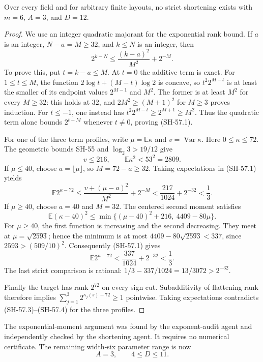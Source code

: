 \begin{theorem}
\label{thm:width-six-three-term-dimension-twelve}
Over every field and for arbitrary finite layouts, no
strict shortening exists with $m=6$, $A=3$, and $D=12$.
\end{theorem}
\begin{proof}
We use an integer quadratic majorant for the exponential
rank bound.  If $a$ is an integer, $N-a=M\geq32$, and
$k\leq N$ is an integer, then
\[
       2^{k-N}\leq\frac{(k-a)^2}{M^2}+2^{-M}.
 \tag{SH-57.1}
\]
To prove this, put $t=k-a\leq M$.  At $t=0$ the
additive term is exact.  For $1\leq t\leq M$,
the function $2\log t+(M-t)\log2$ is concave, so
$t^2 2^{M-t}$ is at least the smaller of its endpoint
values $2^{M-1}$ and $M^2$.  The former is at least
$M^2$ for every $M\geq32$: this holds at $32$, and
$2M^2\geq(M+1)^2$ for $M\geq3$ proves induction.
For $t\leq-1$, one instead has
$t^2 2^{M-t}\geq2^{M+1}\geq M^2$.
Thus the quadratic term alone bounds $2^{t-M}$
whenever $t\neq0$, proving (SH-57.1).

For one of the three term profiles, write
$\mu=\mathbb E\kappa$ and $v=\operatorname{Var}\kappa$.
Here $0\leq\kappa\leq72$.  The geometric bounds
SH-55 and $\log_2 3>19/12$ give
\[
                 v\leq216,
                 \qquad\mathbb E\kappa^2<53^2=2809.
 \tag{SH-57.2}
\]
If $\mu\leq40$, choose $a=\lfloor\mu\rfloor$,
so $M=72-a\geq32$.  Taking expectations in
(SH-57.1) yields
\[
 \mathbb E2^{\kappa-72}
 \leq\frac{v+(\mu-a)^2}{M^2}+2^{-M}
 <\frac{217}{1024}+2^{-32}<\frac13.
 \tag{SH-57.3}
\]
If $\mu\geq40$, choose $a=40$ and $M=32$.
The centered second moment satisfies
\[
 \mathbb E(\kappa-40)^2
 \leq\min\{(\mu-40)^2+216,\ 4409-80\mu\}.
\]
For $\mu\geq40$, the first function is increasing
and the second decreasing.  They meet at
$\mu=\sqrt{2593}$; hence the minimum is at most
$4409-80\sqrt{2593}<337$, since
$2593>(509/10)^2$.
Consequently (SH-57.1) gives
\[
       \mathbb E2^{\kappa-72}
       <\frac{337}{1024}+2^{-32}<\frac13.
 \tag{SH-57.4}
\]
The last strict comparison is rational:
$1/3-337/1024=13/3072>2^{-32}$.

Finally the target has rank $2^{72}$ on every sign cut.
Subadditivity of flattening rank therefore implies
$\sum_{j=1}^3 2^{\kappa_j(s)-72}\geq1$ pointwise.
Taking expectations contradicts (SH-57.3)--(SH-57.4)
for the three profiles.
\end{proof}

The exponential-moment argument was found by the
exponent-audit agent and independently checked by the
shortening agent.  It requires no numerical certificate.
The remaining width-six parameter range is now
\[
                         A=3,\qquad4\leq D\leq11.
\]

